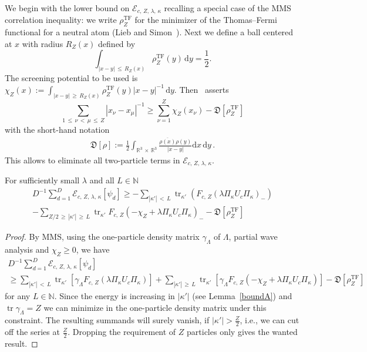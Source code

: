 \documentclass[AHL,Unicode,longabstracts,published]{cedram}
\newcommand{\TF}{\mathrm{TF}}
\DeclareMathOperator{\tr}{tr}
\newcommand*\dx{\mathrm{d}x}
\newcommand*\dy{\mathrm{d}y}
\newcommand*\nz{\mathbb{N}}
\newcommand*\rz{\mathbb{R}}
\newcommand*\cE{\mathcal{E}}
\newcommand*\gD{\mathfrak{D}}
\begin{document}
We begin with the lower bound on $\cE_{c,\,Z,\,\lambda,\,\kappa}$ recalling a special case of the MMS correlation inequality: we write $\rho_Z^{\TF}$ for the minimizer of the Thomas--Fermi functional for a neutral atom (Lieb and Simon~\cite[Theorem~II.20]{LiebSimon1977}). Next we define a ball centered at $x$ with radius $R_Z(x)$ defined by
\[
\int_{|x-y|\,\leq\,R_Z(x)}\rho_Z^{\TF}(y)\,\dy=\frac12.
\]
The screening potential to be used is $\chi_Z(x):=\int_{|x-y|\,\geq\,R_Z(x)}\rho_Z^{\TF}(y)|x-y|^{-1}\,\dy$. Then~\cite{Mancasetal2004} asserts
\begin{equation}\label{MMS}
\sum_{1\,\leq\,\nu\,<\,\mu\,\leq\,Z}|x_\nu-x_\mu|^{-1}
\geq \sum_{\nu=1}^Z\chi_Z(x_\nu)-\gD\left[\rho_Z^{\TF}\right]
\end{equation}
with the short-hand notation
\begin{align*}
\gD[\rho] := \frac12 \int_{\rz^3\,\times\,\rz^3}\frac{\overline{\rho(x)}\rho(y)}{|x-y|}\dx\,\dy\,.
\end{align*}
This allows to eliminate all two-particle terms in $\cE_{c,\,Z,\,\lambda,\,\kappa}$.


\begin{lemm}\label{correlation}
For sufficiently small $\lambda$ and all $L\in\nz$
\begin{multline}\label{Korrelation}
D^{-1}\sum_{d=1}^D\cE_{c,\,Z,\,\lambda,\,\kappa}\left[\psi_d\right]
\geq -\sum_{|{\kappa'}|\,<\,L}\tr_{\kappa'}\left(F_{c,\,Z}\left(\lambda\Pi_{\kappa} U_c\Pi_{\kappa}\right)_{-} \right)  \\
- \sum_{Z/2\,\geq\,|{\kappa'}|\,\geq\,L}\tr_{\kappa'} F_{c,\,Z}\left(-\chi_Z+\lambda \Pi_\kappa U_c\Pi_\kappa\right)_- - \gD\left[\rho_Z^{\TF}\right]
\end{multline}
\end{lemm}

\begin{proof}
By MMS, using the one-particle density matrix $\gamma_\Lambda$ of $\Lambda$, partial wave analysis and $\chi_Z\geq0$, we have
\begin{multline}
D^{-1}\sum_{d=1}^D\cE_{c,\,Z,\,\lambda,\,\kappa}\left[\psi_d\right] \\
\geq \sum_{|{\kappa'}|\,<\,L}\tr_{\kappa'}\left[\gamma_\Lambda F_{c,\,Z}\left(\lambda\Pi_\kappa U_c\Pi_\kappa\right)\right] + \sum_{|{\kappa'}|\,\geq\,L}\tr_{\kappa'}\left[\gamma_\Lambda F_{c,\,Z}\left(-\chi_Z+\lambda \Pi_\kappa U_c\Pi_\kappa\right)\right] - \gD\left[\rho_Z^{\TF}\right]
\end{multline}
for any $L\in\nz$. Since the energy is increasing in $|\kappa'|$ (see Lemma~\ref{boundA}) and $\tr\gamma_\Lambda=Z$ we can minimize in the one-particle density matrix under this constraint. The resulting summands will surely vanish, if $|{\kappa'}|>\tfrac{Z}{2}$, i.e., we can cut off the series at $\tfrac{Z}{2}$. Dropping the requirement of $Z$ particles only gives the wanted result.
\end{proof}
\end{document}
